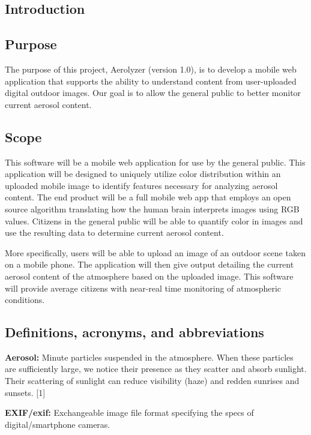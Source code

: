 \documentclass[letterpaper,10pt,draftclsnofoot,onecolumn]{IEEEtran}
\begin{document}
\begin{flushleft}
\clearpage
\tableofcontents
\clearpage

\section{Introduction}
\subsection{Purpose}
The purpose of this project, Aerolyzer (version 1.0), is to develop a mobile web application that supports the ability to understand content from user-uploaded digital outdoor images.
Our goal is to allow the general public to better monitor current aerosol content.

\subsection{Scope}
This software will be a mobile web application for use by the general public. 
This application will be designed to uniquely utilize color distribution within an uploaded mobile image to identify features necessary for analyzing aerosol content. 
The end product will be a full mobile web app that employs an open source algorithm translating how the human brain interprets images using RGB values. 
Citizens in the general public will be able to quantify color in images and use the resulting data to determine current aerosol content. 


More specifically, users will be able to upload an image of an outdoor scene taken on a mobile phone. 
The application will then give output detailing the current aerosol content of the atmosphere based on the uploaded image. 
This software will provide average citizens with near-real time monitoring of atmospheric conditions.

\subsection{Definitions, acronyms, and abbreviations}
\textbf{Aerosol: }Minute particles suspended in the atmosphere. 
When these particles are sufficiently large, we notice their presence as they scatter and absorb sunlight. 
Their scattering of sunlight can reduce visibility (haze) and redden sunrises and sunsets. [1]

\textbf{EXIF/exif: }Exchangeable image file format specifying the specs of digital/smartphone cameras. 


\end{flushleft}
\end{document}
